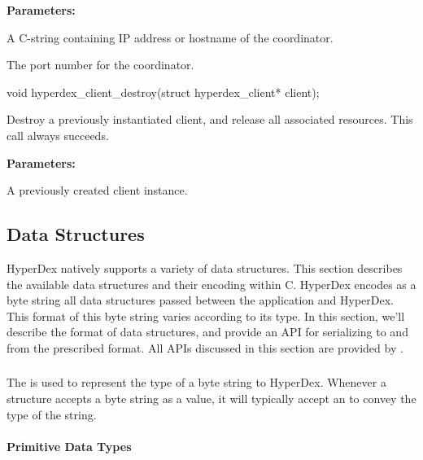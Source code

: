 \noindent\textbf{Parameters:}
\begin{description}[labelindent=\widthof{{\code{coordinator}}},leftmargin=*,noitemsep,nolistsep,align=right]
\item[\code{coordinator}] A C-string containing IP address or hostname of the
    coordinator.
\item[\code{port}] The port number for the coordinator.
\end{description}

\begin{ccode}
void
hyperdex_client_destroy(struct hyperdex_client* client);
\end{ccode}
Destroy a previously instantiated client, and release all associated
resources.  This call always succeeds.

\noindent\textbf{Parameters:}
\begin{description}[labelindent=\widthof{{\code{client}}},leftmargin=*,noitemsep,nolistsep,align=right]
\item[\code{client}] A previously created client instance.
\end{description}

\subsection{Data Structures}
\label{sec:api:c:client:data-structures}

HyperDex natively supports a variety of data structures.  This section describes
the available data structures and their encoding within C.  HyperDex encodes as
a byte string all data structures passed between the application and HyperDex.
This format of this byte string varies according to its type.  In this section,
we'll describe the format of data structures, and provide an API for serializing
to and from the prescribed format.  All APIs discussed in this section are
provided by .

\subsubsection{}
\label{sec:api:c:client:hyperdatatype}

The  is used to represent the type of a byte string to
HyperDex.  Whenever a structure accepts a byte string as a value, it will
typically accept an  to convey the type of the string.

\paragraph{Primitive Data Types}

